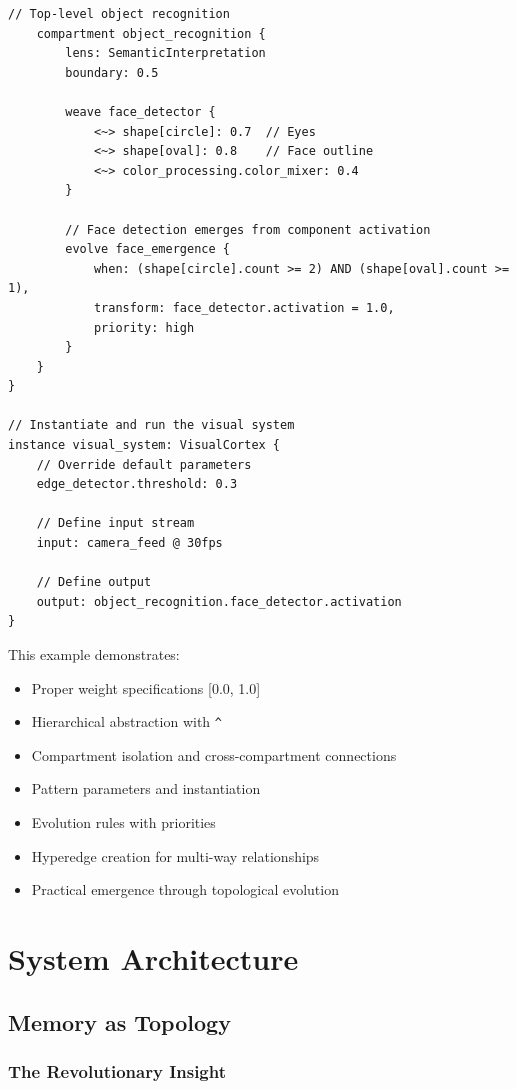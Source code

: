 \documentclass[12pt,a4paper,openany]{book} %
\begin{document}
\begin{lstlisting}[language=loom]
    // Top-level object recognition
    compartment object_recognition {
        lens: SemanticInterpretation
        boundary: 0.5

        weave face_detector {
            <~> shape[circle]: 0.7  // Eyes
            <~> shape[oval]: 0.8    // Face outline
            <~> color_processing.color_mixer: 0.4
        }

        // Face detection emerges from component activation
        evolve face_emergence {
            when: (shape[circle].count >= 2) AND (shape[oval].count >= 1),
            transform: face_detector.activation = 1.0,
            priority: high
        }
    }
}

// Instantiate and run the visual system
instance visual_system: VisualCortex {
    // Override default parameters
    edge_detector.threshold: 0.3

    // Define input stream
    input: camera_feed @ 30fps

    // Define output
    output: object_recognition.face_detector.activation
}
\end{lstlisting}
\vspace{0.5em}

This example demonstrates:
\begin{itemize}
\item Proper weight specifications [0.0, 1.0]
\item Hierarchical abstraction with \texttt{\^{}}
\item Compartment isolation and cross-compartment connections
\item Pattern parameters and instantiation
\item Evolution rules with priorities
\item Hyperedge creation for multi-way relationships
\item Practical emergence through topological evolution
\end{itemize}

\cleardoublepage
\part{System Architecture}

\chapter{Memory as Topology}

\section{The Revolutionary Insight}
\end{document}
